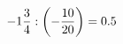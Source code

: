 \documentclass[preview]{standalone}
\begin{document}
\begin{align*}
-1 { 3 \over 4 }  :  \left( - { 10 \over 20 } \right) = 0.5
\end{align*}
\end{document}
